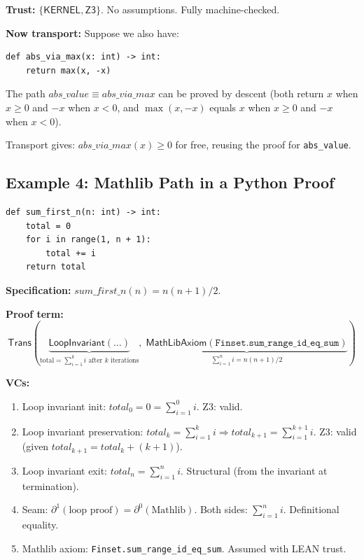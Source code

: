 \textbf{Trust:} $\{\mathsf{KERNEL}, \mathsf{Z3}\}$.
No assumptions.  Fully machine-checked.

\textbf{Now transport:} Suppose we also have:
\begin{lstlisting}
def abs_via_max(x: int) -> int:
    return max(x, -x)
\end{lstlisting}

The path $\mathit{abs\_value} \equiv \mathit{abs\_via\_max}$ can
be proved by descent (both return $x$ when $x \geq 0$ and $-x$
when $x < 0$, and $\max(x, -x)$ equals $x$ when $x \geq 0$ and
$-x$ when $x < 0$).

Transport gives: $\mathit{abs\_via\_max}(x) \geq 0$ for free,
reusing the proof for \texttt{abs\_value}.


\subsection{Example 4: Mathlib Path in a Python Proof}
\label{sec:ex-mathlib}

\begin{lstlisting}
def sum_first_n(n: int) -> int:
    total = 0
    for i in range(1, n + 1):
        total += i
    return total
\end{lstlisting}

\textbf{Specification:}
$\mathit{sum\_first\_n}(n) = n(n+1)/2$.

\textbf{Proof term:}
\[
  \mathsf{Trans}\left(
    \underbrace{\mathsf{LoopInvariant}(\ldots)}_
      {\text{total} = \sum_{i=1}^k i \text{ after } k \text{ iterations}},\;
    \underbrace{\mathsf{MathLibAxiom}(\texttt{Finset.sum\_range\_id\_eq\_sum})}_
      {\sum_{i=1}^n i = n(n+1)/2}
  \right)
\]

\textbf{VCs:}
\begin{enumerate}
\item Loop invariant init: $\mathit{total}_0 = 0 = \sum_{i=1}^0 i$.
  Z3: valid.
\item Loop invariant preservation:
  $\mathit{total}_k = \sum_{i=1}^k i \Rightarrow
  \mathit{total}_{k+1} = \sum_{i=1}^{k+1} i$.
  Z3: valid (given $\mathit{total}_{k+1} = \mathit{total}_k + (k+1)$).
\item Loop invariant exit:
  $\mathit{total}_n = \sum_{i=1}^n i$.
  Structural (from the invariant at termination).
\item Seam: $\partial^1(\text{loop proof}) = \partial^0(\text{Mathlib})$.
  Both sides: $\sum_{i=1}^n i$.  Definitional equality.
\item Mathlib axiom: \texttt{Finset.sum\_range\_id\_eq\_sum}.
  Assumed with \textsf{LEAN} trust.
\end{enumerate}

